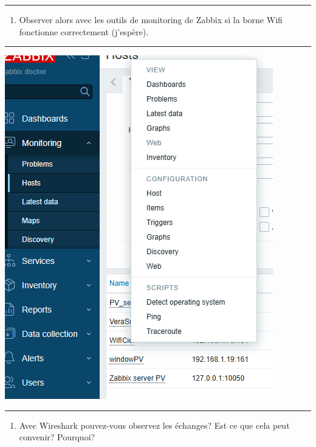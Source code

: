 \documentclass[french, 12pt]{article}%
\begin{document}
\begin{center}
 \rule{0.75\linewidth}{1pt}
 \end{center}

\begin{enumerate}[resume]
\item Observer alors avec les outils de monitoring de Zabbix si la borne Wifi fonctionne correctement (j'espère). 
\end{enumerate}

\begin{center}
 \rule{0.75\linewidth}{1pt}
 \end{center}

\begin{center}
\includegraphics[scale=0.4]{./ressource/zabbixObservation}
\end{center}


\begin{center}
 \rule{0.75\linewidth}{1pt}
 \end{center}

\begin{enumerate}[resume]
\item Avec Wireshark pouvez-vous observez les échanges? Est ce que cela peut convenir? Pourquoi? 
\end{enumerate}
\end{document}
